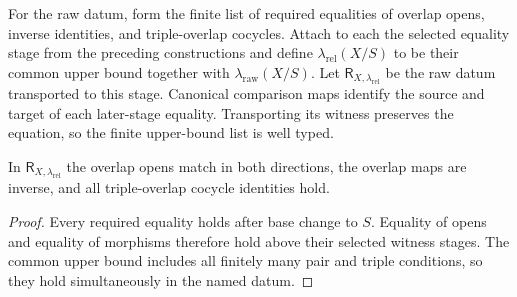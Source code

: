 \begin{definition}
  \label{def:nagata-relative-gluing-valid-stage}

  For the raw datum, form the finite list of required equalities of overlap
  opens, inverse identities, and triple-overlap cocycles.  Attach to each the
  selected equality stage from the preceding constructions and define
  $\lambda_{\mathrm{rel}}(X/S)$ to be their common upper bound together with
  $\lambda_{\mathrm{raw}}(X/S)$.  Let
  $\mathsf R_{X,\lambda_{\mathrm{rel}}}$ be the raw datum transported to this
  stage.
  Canonical comparison maps identify the source and target of each later-stage
  equality. Transporting its witness preserves the equation, so the finite
  upper-bound list is well typed.
\end{definition}

\begin{lemma}
  \label{lemma:nagata-relative-gluing-axioms-eventually}

  In $\mathsf R_{X,\lambda_{\mathrm{rel}}}$ the overlap opens match in both
  directions, the overlap maps are inverse, and all triple-overlap cocycle
  identities hold.
\end{lemma}

\begin{proof}
  Every required equality holds after base change to $S$.  Equality of opens
  and equality of morphisms therefore hold above their selected witness
  stages.  The common upper bound includes all finitely many pair and triple
  conditions, so they hold simultaneously in the named datum.
\end{proof}

